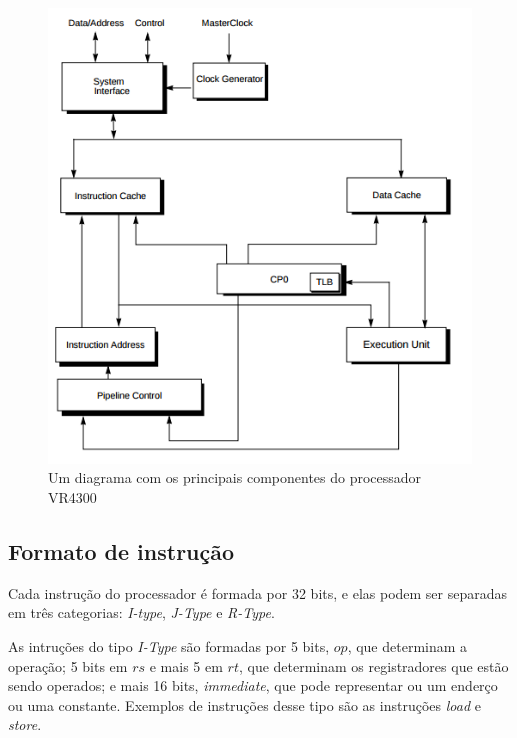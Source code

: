 \documentclass[12pt]{article}
\begin{document}
\begin{figure}[H]
    \label{fig:vr4300dia}
    \centering
       \includegraphics[scale=.65]{figures/vr4300diagram}
    \caption{Um diagrama com os principais componentes do processador 
        VR4300}
\end{figure}

\subsection{Formato de instrução}
    Cada instrução do processador é formada por 32 bits, e elas podem
ser separadas em três categorias: \emph{I-type}, \emph{J-Type} e 
\emph{R-Type}. 

    As intruções do tipo \emph{I-Type} são formadas por 5 bits, $op$,
que determinam a operação; 5 bits em $rs$ e mais 5 em $rt$, que
determinam os registradores que estão sendo operados; e mais 16 bits,
{\em immediate}, que pode representar ou um enderço ou uma constante.
Exemplos de instruções desse tipo são as instruções {\em load} e 
{\em store}.
\end{document}
